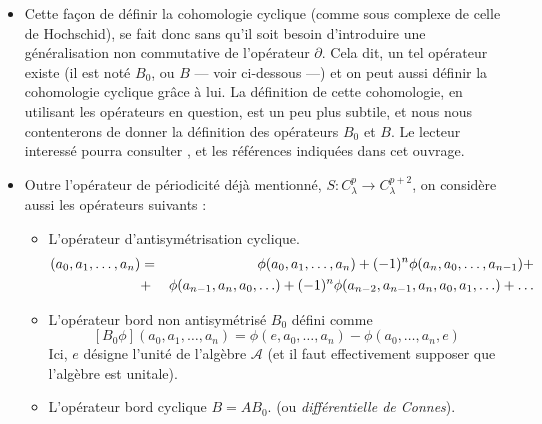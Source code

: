 \begin{itemize}
  Ce r\'esultat sugg\`ere qu'il existe une fa\c con canonique d'envoyer
 $  H_\lambda^p $  dans  $  H_\lambda^{p+2},$ et c'est effectivement le 
 cas (pour une alg\`ebre ${\mathcal A}$ quelconque, d'ailleurs).
 En fait, on peut d\'emontrer un r\'esultat encore plus fort: pour toute 
 alg\`ebre, on peut d\'efinir un op\'erateur  $  S ,$ souvent d\'esign\'e sous 
 le nom de ``op\'erateur de p\'eriodicit\'e de Connes'', qui envoie  $  
 C_\lambda^p $   dans
 $  C_\lambda^{p+2} $   -- le symbole $  C_\lambda^*$ se r\'eferrant aux 
 cochaines cycliques. 
 
 \item Cette fa\c con de d\'efinir la cohomologie cyclique (comme sous 
 complexe de celle de Hochschid), se fait donc sans qu'il soit besoin 
 d'introduire une 
 g\'en\'eralisation non commutative de l'op\'erateur $\partial $. Cela dit, 
 un tel op\'erateur existe (il est not\'e $B_{0}$, ou $B$ --- voir 
 ci-dessous ---) et on peut aussi d\'efinir la cohomologie cyclique 
 gr\^ace \`a lui. La d\'efinition de cette cohomologie, en utilisant 
 les op\'erateurs en question, est un peu plus subtile, et nous nous 
 contenterons de donner la d\'efinition des op\'erateurs $B_{0}$ et 
 $B$.
 Le lecteur interess\'e pourra consulter \cite{ConnesIHES}, \cite{ACbook} et les 
 r\'ef\'erences indiqu\'ees dans cet ouvrage.
 
 \item
 
Outre l'op\'erateur de p\'eriodicit\'e d\'ej\`a mentionn\'e,  $  S : C_{\lambda}^p
\rightarrow C_\lambda^{p+2} $,  on  consid\`ere aussi les 
op\'erateurs suivants :\par
 \begin{itemize}
 	\item  L'op\'erateur d'antisym\'etrisation cyclique.
 	 \begin{eqnarray*}
   [A \phi](a_0,a_1,\ldots, a_n)  &=& \, \phi(a_0,a_1,\ldots,a_n) + (-1)^n
\phi(a_n,a_0,\ldots, a_{n-1}) + \cr 
{} & + &\phi(a_{n-1},a_n,a_0,\ldots) + (-1)^n\phi(a_{n-2},a_{n-1},a_n ,a_0,a_1,\ldots) + \ldots 
\end{eqnarray*}
 
 	\item  L'op\'erateur bord non antisym\'etris\'e $B_0$ d\'efini comme
 	 $$     [B_0 \phi](a_0,a_1,\ldots,a_n) = \phi(e,a_0,\ldots,a_n) - 
\phi(a_0,\ldots,a_n,e) $$   Ici,  $e$  d\'esigne l'unit\'e de l'alg\`ebre ${\mathcal A}$ (et il faut 
effectivement supposer que l'alg\`ebre est unitale).
 
 	\item  L'op\'erateur bord cyclique $ B  =  A B_0.$ (ou {\sl 
 	diff\'erentielle de Connes\/}). 
 	

\end{itemize}
\end{itemize}
